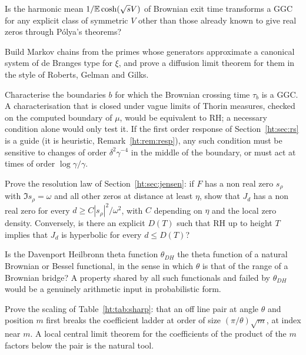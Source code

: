 \begin{problem}
Is the harmonic mean $1/\mathbb{E}\cosh(\sqrt sV)$ of Brownian exit time transforms a GGC for any explicit class of symmetric $V$ other than those already known to give real zeros through P\'olya's theorems?
\end{problem}

\begin{problem}
Build Markov chains from the primes whose generators approximate a canonical system of de Branges type for $\xi$, and prove a diffusion limit theorem for them in the style of Roberts, Gelman and Gilks.
\end{problem}

\begin{problem}\label{ht:prob:rs}
Characterise the boundaries $b$ for which the Brownian crossing time $\tau_b$ is a GGC. A characterisation that is closed under vague limits of Thorin measures, checked on the computed boundary of $\mu$, would be equivalent to RH; a necessary condition alone would only test it. If the first order response of Section~\ref{ht:sec:rs} is a guide (it is heuristic, Remark~\ref{ht:rem:resp}), any such condition must be sensitive to changes of order $\delta^2\gamma^{-4}$ in the middle of the boundary, or must act at times of order $\log\gamma/\gamma$.
\end{problem}

\begin{problem}\label{ht:prob:jensen}
Prove the resolution law of Section~\ref{ht:sec:jensen}: if $F$ has a non real zero $s_\rho$ with $\Im s_\rho=\omega$ and all other zeros at distance at least $\eta$, show that $J_d$ has a non real zero for every $d\ge C|s_\rho|^2/\omega^2$, with $C$ depending on $\eta$ and the local zero density. Conversely, is there an explicit $D(T)$ such that RH up to height $T$ implies that $J_d$ is hyperbolic for every $d\le D(T)$?
\end{problem}

\begin{problem}\label{ht:prob:yor}
Is the Davenport Heilbronn theta function $\theta_{DH}$ the theta function of a natural Brownian or Bessel functional, in the sense in which $\theta$ is that of the range of a Brownian bridge? A property shared by all such functionals and failed by $\theta_{DH}$ would be a genuinely arithmetic input in probabilistic form.
\end{problem}

\begin{problem}\label{ht:prob:scaling}
Prove the scaling of Table~\ref{ht:tab:sharp}: that an off line pair at angle $\theta$ and position $m$ first breaks the coefficient ladder at order of size $(\pi/\theta)\sqrt m$, at index near $m$. A local central limit theorem for the coefficients of the product of the $m$ factors below the pair is the natural tool.
\end{problem}

